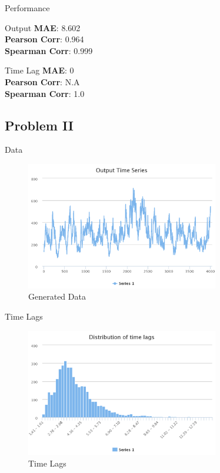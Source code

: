 \documentclass{beamer}
\begin{document}
\begin{frame}{Performance}
 
\begin{block}{Output}
\textbf{MAE}: 8.602 \\
\textbf{Pearson Corr}: 0.964 \\
\textbf{Spearman Corr}: 0.999
\end{block}

\begin{block}{Time Lag}
\textbf{MAE}: 0 \\
\textbf{Pearson Corr}: N.A \\
\textbf{Spearman Corr}: 1.0
\end{block}



\end{frame}



\subsection{Problem II}
\begin{frame}{Data}
    \begin{figure}[h]
        \includegraphics[width=0.75\textwidth]{timeseries-problem-ii.png}
        \caption{Generated Data}
        \label{fig:TimeSeries-ii}
      \end{figure}
\end{frame}

\begin{frame}{Time Lags}
    \begin{figure}[h]
        \includegraphics[width=0.75\textwidth]{data-hist-problem-ii.png}
        \caption{Time Lags}
        \label{fig:TimeLags-ii}
      \end{figure}
\end{frame}
\end{document}
